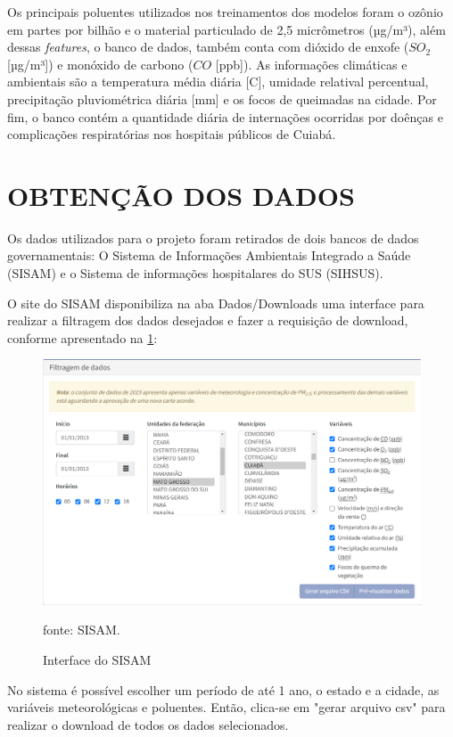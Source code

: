 \documentclass[
  12pt,		%
  a4paper,	%
  openright,%
  oneside,	%
  chapter=TITLE,		%
  section=TITLE,		%
  english,	%
  french,	%
  spanish,	%
  brazil	%
]{abntex2}
\begin{document}
    Os principais poluentes utilizados nos treinamentos dos modelos foram o ozônio em partes por bilhão e
    o material particulado de 2,5 micrômetros (µg/m³), além dessas \textit{features}, o banco de
    dados, também conta com dióxido de enxofe ($SO_2$ [µg/m³]) e monóxido de carbono ($CO$ [ppb]). As informações
    climáticas e ambientais são a temperatura média diária [\textdegree C], umidade relatival percentual, 
     precipitação pluviométrica diária [mm] e os focos de queimadas na cidade. Por fim, o banco contém 
    a quantidade diária de internações ocorridas por doênças e complicações respiratórias nos hospitais públicos
    de Cuiabá. 

    \section{OBTENÇÃO DOS DADOS}
    
    Os dados utilizados para o projeto foram retirados de dois bancos de dados governamentais: O 
    Sistema de Informações Ambientais Integrado a Saúde (SISAM) e o Sistema de informações hospitalares do SUS (SIHSUS).

    O site do SISAM disponibiliza na aba Dados/Downloads uma interface para realizar a filtragem dos dados desejados e 
    fazer a requisição de download, conforme apresentado na \ref*{int_sisam}:

    \begin{figure}[ht]
        \centering
        \caption{Interface do SISAM}
        \includegraphics[width=12cm]{../reports/figures/interface_SISAM.png}
        \label{int_sisam}
        \par
        {\small fonte: SISAM.}
    \end{figure}

    No sistema é possível escolher um período de até 1 ano, o estado e a cidade, as variáveis 
    meteorológicas e poluentes. Então, clica-se em "gerar arquivo csv" para realizar o download de todos os
    dados selecionados.
\end{document}
